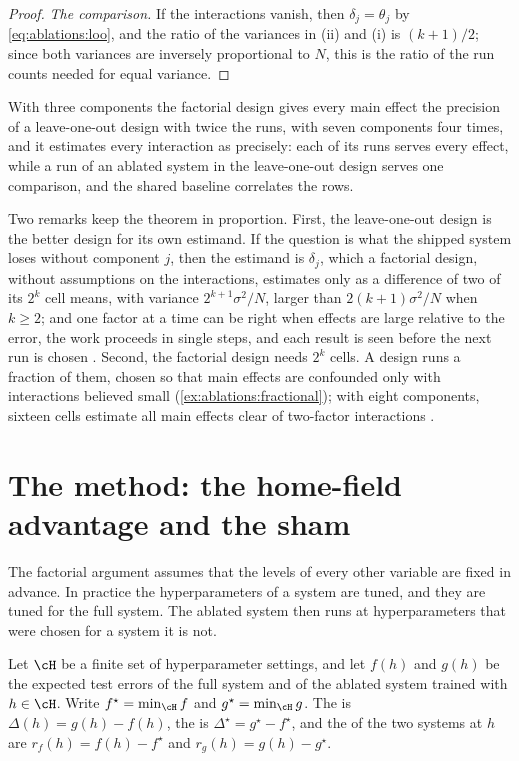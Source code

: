 \begin{refsection}
\begin{proof}
\emph{The comparison.} If the interactions vanish, then $\delta_j=\theta_j$ by \eqref{eq:ablations:loo}, and the ratio of the variances in (ii) and (i) is $(k+1)/2$; since both variances are inversely proportional to $N$, this is the ratio of the run counts needed for equal variance.
\end{proof}

With three components the factorial design gives every main effect the precision of a leave-one-out design with twice the runs, with seven components four times, and it estimates every interaction as precisely: each of its runs serves every effect, while a run of an ablated system in the leave-one-out design serves one comparison, and the shared baseline correlates the rows.

Two remarks keep the theorem in proportion. First, the leave-one-out design is the better design for its own estimand. If the question is what the shipped system loses without component $j$, then the estimand is $\delta_j$, which a factorial design, without assumptions on the interactions, estimates only as a difference of two of its $2^k$ cell means, with variance $2^{k+1}\sigma^2/N$, larger than $2(k+1)\sigma^2/N$ when $k\ge2$; and one factor at a time can be right when effects are large relative to the error, the work proceeds in single steps, and each result is seen before the next run is chosen \parencite{Daniel1973}. Second, the factorial design needs $2^k$ cells. A  design runs a fraction of them, chosen so that main effects are confounded only with interactions believed small (\cref{ex:ablations:fractional}); with eight components, sixteen cells estimate all main effects clear of two-factor interactions \parencite{BoxHunterHunter2005}.

\section{The method: the home-field advantage and the sham}\label{sec:ablations:homefield}

The factorial argument assumes that the levels of every other variable are fixed in advance. In practice the hyperparameters of a system are tuned, and they are tuned for the full system. The ablated system then runs at hyperparameters that were chosen for a system it is not.

\begin{definition}\label{def:ablations:retuned}
Let $\cH$ be a finite set of hyperparameter settings, and let $f(h)$ and $g(h)$ be the expected test errors of the full system and of the ablated system trained with $h\in\cH$. Write $f^\star=\min_\cH f$ and $g^\star=\min_\cH g$. The  is $\Delta(h)=g(h)-f(h)$, the  is $\Delta^\star=g^\star-f^\star$, and the  of the two systems at $h$ are $r_f(h)=f(h)-f^\star$ and $r_g(h)=g(h)-g^\star$.
\end{definition}


\end{refsection}
